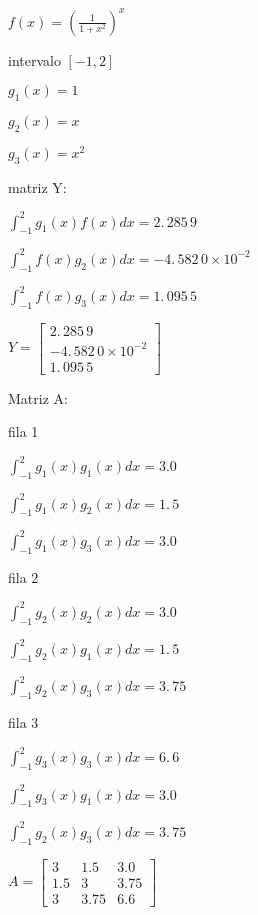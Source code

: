 \documentclass{article}
\begin{document}
$f(x)=(\frac{1}{1+x^{2}})^{x}$

intervalo $\left[ -1,2\right] $

$g_{1}(x)=1$

$g_{2}(x)=x$

$g_{3}(x)=x^{2}$

\bigskip 

matriz Y:

$\int_{-1}^{2}g_{1}(x)f(x)dx=\allowbreak 2.\,\allowbreak 285\,9$

$\int_{-1}^{2}f(x)g_{2}(x)dx=\allowbreak -4.\,\allowbreak 582\,0\times
10^{-2}$

$\int_{-1}^{2}f(x)g_{3}(x)dx=\allowbreak 1.\,\allowbreak 095\,5$

\bigskip 

$Y=\left[ 
\begin{array}{c}
\allowbreak 2.\,\allowbreak 285\,9 \\ 
-4.\,\allowbreak 582\,0\times 10^{-2} \\ 
1.\,\allowbreak 095\,5%
\end{array}%
\right] $

Matriz A:

fila 1

$\int_{-1}^{2}g_{1}(x)g_{1}(x)dx=\allowbreak 3.0$

$\int_{-1}^{2}g_{1}(x)g_{2}(x)dx=\allowbreak 1.\,\allowbreak 5$

$\int_{-1}^{2}g_{1}(x)g_{3}(x)dx=\allowbreak 3.0$

\bigskip fila 2

$\int_{-1}^{2}g_{2}(x)g_{2}(x)dx=\allowbreak 3.0$

$\int_{-1}^{2}g_{2}(x)g_{1}(x)dx=\allowbreak 1.\,\allowbreak 5$

$\int_{-1}^{2}g_{2}(x)g_{3}(x)dx\allowbreak =\allowbreak 3.\,\allowbreak 75$

fila 3

$\int_{-1}^{2}g_{3}(x)g_{3}(x)dx=\allowbreak 6.\,\allowbreak 6$

$\int_{-1}^{2}g_{3}(x)g_{1}(x)dx=\allowbreak 3.0$

$\int_{-1}^{2}g_{2}(x)g_{3}(x)dx=\allowbreak 3.\,\allowbreak 75$

\bigskip 

$A=\left[ 
\begin{array}{ccc}
3 & 1.5 & 3.0 \\ 
1.5 & 3 & 3.75 \\ 
3 & 3.75 & 6.6%
\end{array}%
\right] $
\end{document}
